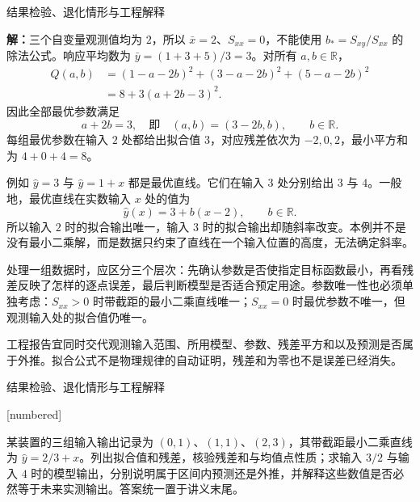 \documentclass[aspectratio=169,10pt,fontset=fandol]{ctexbeamer}
\makeatletter
\newcommand{\mathagentexerciselabelcontext}[1]{%
\hypertarget<1>{#1}{}%
\edef\@currentHref{#1}%
}
\makeatother
\begin{document}
\begin{frame}[t,fragile]{结果检验、退化情形与工程解释}
\footnotesize
{\footnotesize
\par\noindent\textbf{解：}三个自变量观测值均为 $2$，所以 $\bar{x}=2$、$S_{xx}=0$，不能使用 $b_*=S_{xy}/S_{xx}$ 的除法公式。响应平均数为 $\bar{y}=(1+3+5)/3=3$。对所有 $a,b\in\mathbb{R}$，
\[
\begin{aligned}
Q(a,b)&=(1-a-2b)^2+(3-a-2b)^2+(5-a-2b)^2\\
&=8+3(a+2b-3)^2.
\end{aligned}
\]
因此全部最优参数满足
\[
a+2b=3,
\quad\text{即}\quad (a,b)=(3-2b,b),\qquad b\in\mathbb{R}.
\]
每组最优参数在输入 $2$ 处都给出拟合值 $3$，对应残差依次为 $-2,0,2$，最小平方和为 $4+0+4=8$。


}
{\footnotesize
例如 $\hat{y}=3$ 与 $\hat{y}=1+x$ 都是最优直线。它们在输入 $3$ 处分别给出 $3$ 与 $4$。一般地，最优直线在实数输入 $x$ 处的值为
\[
\hat{y}(x)=3+b(x-2),\qquad b\in\mathbb{R}.
\]
所以输入 $2$ 时的拟合输出唯一，输入 $3$ 时的拟合输出却随斜率改变。本例并不是没有最小二乘解，而是数据只约束了直线在一个输入位置的高度，无法确定斜率。\par

}
{\footnotesize
处理一组数据时，应区分三个层次：先确认参数是否使指定目标函数最小，再看残差反映了怎样的逐点误差，最后判断模型是否适合预定用途。参数唯一性也必须单独考虑：$S_{xx}>0$ 时带截距的最小二乘直线唯一；$S_{xx}=0$ 时最优参数不唯一，但观测输入处的拟合值仍唯一。


}
{\footnotesize
工程报告宜同时交代观测输入范围、所用模型、参数、残差平方和以及预测是否属于外推。拟合公式不是物理规律的自动证明，残差和为零也不是误差已经消失。\par

}
\end{frame}
\begin{frame}[t,fragile]{结果检验、退化情形与工程解释}
\normalsize
{\normalsize
[numbered]
\mathagentexerciselabelcontext{mathagent.exercise.U0050.0}
\begin{exercise}
\label{mathagent:exercise:792316d6ae426af3441a87022eb342411ffcb273e3da7957f4be83fb59518d0a}
某装置的三组输入输出记录为 $(0,1)$、$(1,1)$、$(2,3)$，其带截距最小二乘直线为 $\hat{y}=2/3+x$。列出拟合值和残差，核验残差和与均值点性质；求输入 $3/2$ 与输入 $4$ 时的模型输出，分别说明属于区间内预测还是外推，并解释这些数值是否必然等于未来实测输出。答案统一置于讲义末尾。
\end{exercise}
}
\end{frame}
\end{document}
